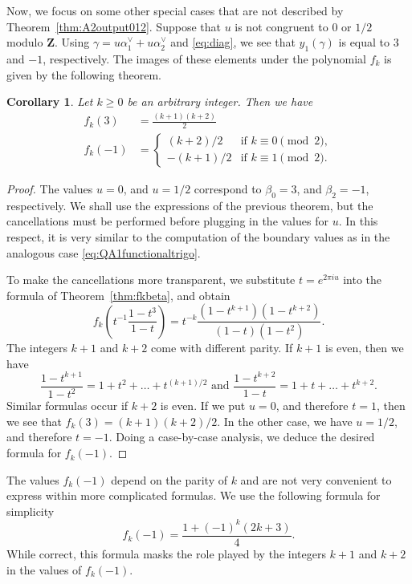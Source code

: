 \documentclass{amsart}
\newcommand{\Z}{\mathbf Z}
\numberwithin{equation}{section}
\theoremstyle{plain}
\newtheorem{corollary}[theorem]{Corollary}
\theoremstyle{definition}
\begin{document}
Now, we focus on some other special cases that are not described by Theorem~\ref{thm:A2output012}. Suppose that $u$ is not congruent to $0$ or $1/2$ modulo $\Z$. Using $\gamma =u\alpha_1^\vee +u\alpha_2^\vee$ and \eqref{eq:diag}, we see that $y_1(\gamma)$ is equal to $3$ and $-1$, respectively. The images of these elements under the polynomial $f_k$ is given by the following theorem. 

\begin{corollary}\label{cor:A2outputnoundary} Let $k\ge 0$ be an arbitrary integer. Then we have
	\begin{align*}
		f_k(3)&=\frac{(k+1)(k+2)}{2}\\
		f_k(-1)&=
		\begin{cases} 
			(k+2)/2 & \text{if } k \equiv 0\pmod2, \\
			-(k+1)/2 & \text{if } k \equiv 1\pmod2.
		\end{cases}		
	\end{align*}
\end{corollary}
\begin{proof}
The values $u=0$, and $u=1/2$ correspond to $\beta_0=3$, and $\beta_2=-1$, respectively. We shall use the expressions of the previous theorem, but the cancellations must be performed before plugging in the values for $u$. In this respect, it is very similar to the computation of the boundary values as in the analogous case \eqref{eq:QA1functionaltrigo}.

To make the cancellations more transparent, we substitute $t=e^{2\pi i u}$ into the formula of Theorem~\ref{thm:fkbeta}, and obtain
$$f_k\left(t^{-1}\dfrac{1-t^3}{1-t}\right) = t^{-k}\frac{(1-t^{k+1})(1-t^{k+2})}{(1-t)(1-t^2)}.$$
The integers $k+1$ and $k+2$ come with different parity. If $k+1$ is even, then we have
$$\frac{1-t^{k+1}}{1-t^2}=1+t^2+\ldots+t^{(k+1)/2} \text{ and } \frac{1-t^{k+2}}{1-t}=1+t+\ldots+t^{k+2}.$$
Similar formulas occur if $k+2$ is even. If we put $u=0$, and therefore $t=1$, then we see that $f_k(3) = (k+1)(k+2)/2$. In the other case, we have $u=1/2$, and therefore $t=-1$. Doing a case-by-case analysis, we deduce the desired formula for $f_k(-1)$. 
\end{proof}

The values $f_k(-1)$ depend on the parity of $k$ and are not very convenient to express within more complicated formulas. We use the following formula for simplicity 
\[f_k(-1)=\frac{1+(-1)^k(2k+3)}{4}.\]
While correct, this formula masks the role played by the integers $k+1$ and $k+2$ in the values of $f_k(-1)$.
\end{document}
